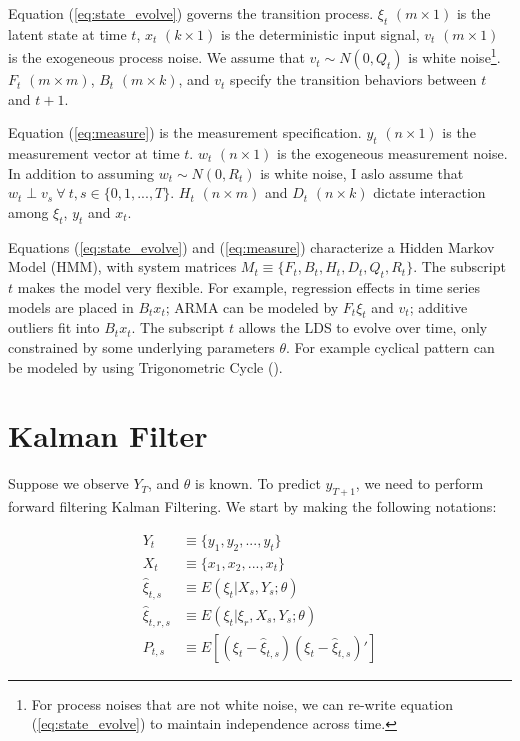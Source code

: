 \documentclass[12pt]{article}
\numberwithin{equation}{section}
\begin{document}
Equation (\ref{eq:state_evolve}) governs the transition process. $\xi_t$ $(m\times 1)$ is the latent state at time $t$, $x_t$ $(k\times 1)$ is the deterministic input signal, $v_t$ $(m\times 1)$ is the exogeneous process noise. We assume that $v_t\sim N(0,Q_t)$ is white noise\footnote{For process noises that are not white noise, we can re-write equation (\ref{eq:state_evolve}) to maintain independence across time.}. $F_t$ $(m\times m)$, $B_t$ $(m\times k)$, and $v_t$ specify the transition behaviors between $t$ and $t+1$. 

Equation (\ref{eq:measure}) is the measurement specification. $y_t$ $(n\times 1)$ is the measurement vector at time $t$. $w_t$ $(n\times 1)$ is the exogeneous measurement noise. In addition to assuming $w_t\sim N(0, R_t)$ is white noise, I aslo assume that  $w_t \perp v_s \ \forall\  t,s\in\{0,1,...,T\}$. $H_t$ $(n\times m)$ and $D_t$ $(n\times k)$ dictate interaction among $\xi_t$, $y_t$ and $x_t$. 

Equations (\ref{eq:state_evolve}) and (\ref{eq:measure}) characterize a Hidden Markov Model (HMM), with system matrices $M_t\equiv\{F_t, B_t, H_t, D_t, Q_t, R_t\}$. The subscript $t$ makes the model very flexible. For example, regression effects in time series models are placed in $B_t x_t$; ARMA can be modeled by $F_t\xi_t$ and $v_t$; additive outliers fit into $B_t x_t$. The subscript $t$ allows the LDS to evolve over time, only constrained by some underlying parameters $\theta$. For example cyclical pattern can be modeled by using Trigonometric Cycle (\cite{harvey_1985}).  

\section{Kalman Filter} \label{sec:filter}

Suppose we observe $Y_T$, and $\theta$ is known. To predict $y_{T+1}$, we need to perform forward filtering Kalman Filtering. We start by making the following notations:

\begin{align*}
    Y_t &\equiv \{y_1, y_2, ..., y_t\} \\
    X_t &\equiv \{x_1, x_2, ..., x_t\} \\
    \hat{\xi}_{t,s} &\equiv E(\xi_t|X_{s},Y_{s};\theta) \\
    \hat{\xi}_{t,r,s} &\equiv E(\xi_t|\xi_r,X_{s},Y_{s};\theta) \\
    P_{t,s} &\equiv E[(\xi_t-\hat{\xi}_{t,s})(\xi_t-\hat{\xi}_{t,s})']
\end{align*}
\end{document}
